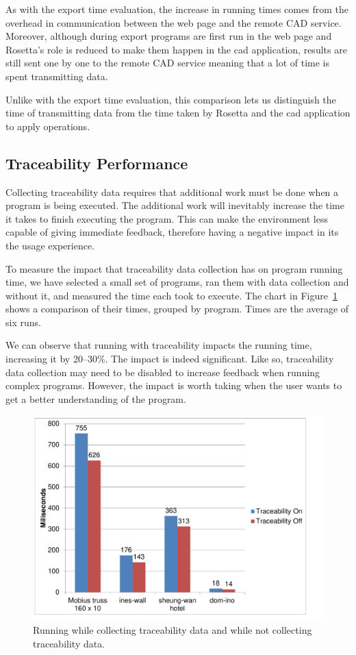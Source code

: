 As with the export time evaluation, the increase in running times comes from the overhead in communication between the web page and the remote CAD service.
Moreover, although during export programs are first run in the web page and Rosetta's role is reduced to make them happen in the \gls{cad} application, results are still sent one by one to the remote CAD service meaning that a lot of time is spent transmitting data.

Unlike with the export time evaluation, this comparison lets us distinguish the time of transmitting data from the time taken by Rosetta and the \gls{cad} application to apply operations.


\subsection{Traceability Performance}
Collecting traceability data requires that additional work must be done when a program is being executed.
The additional work will inevitably increase the time it takes to finish executing the program.
This can make the environment less capable of giving immediate feedback, therefore having a negative impact in its the usage experience.

To measure the impact that traceability data collection has on program running time, we have selected a small set of programs, ran them with data collection and without it, and measured the time each took to execute.
The chart in Figure~\ref{fig:traceability:timing} shows a comparison of their times, grouped by program.
Times are the average of six runs.

We can observe that running with traceability impacts the running time, increasing it by 20--30\%.
The impact is indeed significant.
Like so, traceability data collection may need to be disabled to increase feedback when running complex programs.
However, the impact is worth taking when the user wants to get a better understanding of the program.

\begin{figure}
  \centering
  \includegraphics[width=12cm]{./images/traceability_timing}
  \caption{Running while collecting traceability data and while not collecting traceability data.}
  \label{fig:traceability:timing}
\end{figure}




